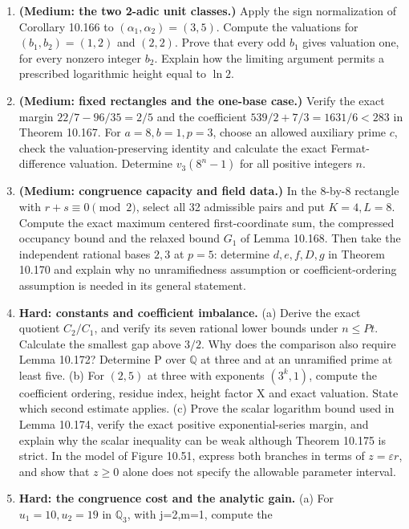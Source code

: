 \documentclass[
  11pt,
  a4paper,
]{article}
\begin{document}
\begin{enumerate}
  first base alone has that precision.
\item
  \textbf{(Medium: the two 2-adic unit classes.)} Apply the sign
  normalization of Corollary 10.166 to \((\alpha_1,\alpha_2)=(3,5)\).
  Compute the valuations for \((b_1,b_2)=(1,2)\) and \((2,2)\). Prove
  that every odd \(b_1\) gives valuation one, for every nonzero integer
  \(b_2\). Explain how the limiting argument permits a prescribed
  logarithmic height equal to \(\ln2\).
\item
  \textbf{(Medium: fixed rectangles and the one-base case.)} Verify the
  exact margin \(22/7-96/35=2/5\) and the coefficient
  \(539/2+7/3=1631/6<283\) in Theorem 10.167. For \(a=8,b=1,p=3\),
  choose an allowed auxiliary prime \(c\), check the
  valuation-preserving identity and calculate the exact
  Fermat-difference valuation. Determine \(v_3(8^n-1)\) for all positive
  integers \(n\).
\item
  \textbf{(Medium: congruence capacity and field data.)} In the
  \(8\)-by-\(8\) rectangle with \(r+s\equiv0\pmod2\), select all 32
  admissible pairs and put \(K=4,L=8\). Compute the exact maximum
  centered first-coordinate sum, the compressed occupancy bound and the
  relaxed bound \(G_1\) of Lemma 10.168. Then take the independent
  rational bases \(2,3\) at \(p=5\): determine \(d,e,f,D,g\) in Theorem
  10.170 and explain why no unramifiedness assumption or
  coefficient-ordering assumption is needed in its general statement.
\item
  \textbf{Hard: constants and coefficient imbalance.} (a) Derive the
  exact quotient \(C_2/C_1\), and verify its seven rational lower bounds
  under \(n\le Pt\). Calculate the smallest gap above \(3/2\). Why does
  the comparison also require Lemma 10.172? Determine P over
  \(\mathbb Q\) at three and at an unramified prime at least five. (b)
  For \((2,5)\) at three with exponents \((3^k,1)\), compute the
  coefficient ordering, residue index, height factor X and exact
  valuation. State which second estimate applies. (c) Prove the scalar
  logarithm bound used in Lemma 10.174, verify the exact positive
  exponential-series margin, and explain why the scalar inequality can
  be weak although Theorem 10.175 is strict. In the model of Figure
  10.51, express both branches in terms of \(z=\varepsilon r\), and show
  that \(z\ge0\) alone does not specify the allowable parameter
  interval.
\item
  \textbf{Hard: the congruence cost and the analytic gain.} (a) For
  \(u_1=10,u_2=19\) in \(\mathbb Q_3\), with j=2,m=1, compute the

\end{enumerate}
\end{document}

